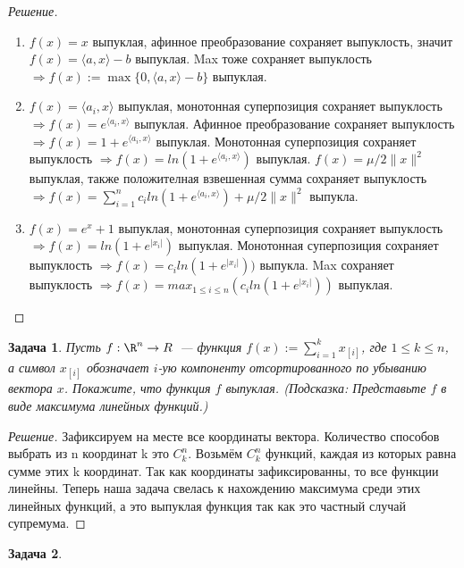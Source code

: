 \documentclass[a4paper]{article}
\newtheorem{problem}{Задача}
\begin{document}
\begin{proof}[Решение]
\begin{enumerate}[label=(\alph*)]
    \item $f(x) = x$ выпуклая, афинное преобразование сохраняет выпуклость, значит $f(x) = \langle a, x \rangle - b$ выпуклая. Max тоже сохраняет выпуклость $\Rightarrow f(x) := \max\{ 0, \langle a, x \rangle - b \}$ выпуклая.
    \item $f(x) = \langle a_i, x \rangle$ выпуклая, монотонная суперпозиция сохраняет выпуклость $ \Rightarrow f(x) = e^{\langle a_i, x \rangle}$  выпуклая. Афинное преобразование сохраняет выпуклость $ \Rightarrow f(x) = 1 + e^{\langle a_i, x \rangle}$ выпуклая. Монотонная суперпозиция сохраняет выпуклость $\Rightarrow f(x) = ln(1 + e^{ \langle a_i, x \rangle})$ выпуклая. $f(x) = \mu / 2 \|x\|^2$ выпуклая, также положителная взвешенная сумма сохраняет выпуклость $\Rightarrow f(x) = \sum _{i = 1} ^{n} c_i ln(1 + e^{\langle a_i, x \rangle}) + \mu / 2 \|x\|^2$ выпукла.
    \item $f(x) = e^x + 1$ выпуклая, монотонная суперпозиция сохраняет выпуклость $\Rightarrow f(x) = ln(1 + e^{|x_i|})$  выпуклая. Монотонная суперпозиция сохраняет выпуклость  $\Rightarrow f(x) = c_i ln(1+e^{|x_i|}))$ выпукла. Max сохраняет выпуклость $\Rightarrow f(x) = max_{1 \leq i \leq n}(c_i ln(1+e^{|x_i|}))$ выпуклая.
\end{enumerate}
\end{proof}

\begin{problem}
    Пусть $f : \R^n \to R$~--- функция $f(x) := \sum_{i=1}^k x_{[i]}$, где $1 \leq k \leq n$, а символ $x_{[i]}$ обозначает $i$-ую компоненту отсортированного по убыванию вектора $x$. Покажите, что функция $f$ выпуклая. (\emph{Подсказка:} Представьте $f$ в виде максимума линейных функций.)
\end{problem}

\begin{proof}[Решение]
        Зафиксируем на месте все координаты вектора. Количество способов выбрать из n координат k это $C^n_k$. Возьмём $C^n_k$ функций, каждая из которых равна сумме этих k координат. Так как координаты зафиксированны, то все функции линейны. Теперь наша задача свелась к нахождению максимума среди этих линейных функций, а это выпуклая функция так как это частный случай супремума.
\end{proof}

\begin{problem}
\end{problem}
\end{document}

